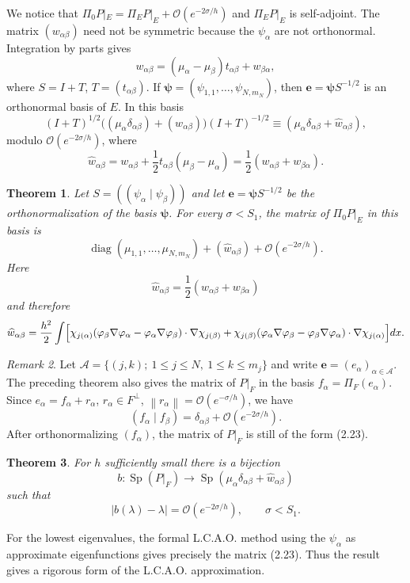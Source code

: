 \documentclass[11pt,a4paper]{article}
\newcommand{\Sp}{\operatorname{Sp}}
\newcommand{\cO}{\mathcal O}
\newcommand{\norm}[1]{\left\lVert #1\right\rVert}
\newcommand{\ip}[2]{\left(#1\mid #2\right)}
\numberwithin{equation}{section}
\newtheorem{theorem}{Theorem}[section]
\theoremstyle{remark}
\newtheorem{remark}[theorem]{Remark}
\begin{document}
We notice that $\Pi_0P|_E=\Pi_EP|_E+\cO(e^{-2\sigma/h})$ and $\Pi_EP|_E$ is self-adjoint. The matrix $(w_{\alpha\beta})$ need not be symmetric because the $\psi_\alpha$ are not orthonormal. Integration by parts gives
\begin{equation}
w_{\alpha\beta}=(\mu_\alpha-\mu_\beta)t_{\alpha\beta}+w_{\beta\alpha},
\tag{2.22}
\end{equation}
where $S=I+T$, $T=(t_{\alpha\beta})$. If $\boldsymbol\psi=(\psi_{1,1},\ldots,\psi_{N,m_N})$, then $\mathbf e=\boldsymbol\psi S^{-1/2}$ is an orthonormal basis of $E$. In this basis
\[
(I+T)^{1/2}\bigl((\mu_\alpha\delta_{\alpha\beta})+(w_{\alpha\beta})\bigr)(I+T)^{-1/2}
\equiv(\mu_\alpha\delta_{\alpha\beta}+\widehat w_{\alpha\beta}),
\]
modulo $\cO(e^{-2\sigma/h})$, where
\[
\widehat w_{\alpha\beta}=w_{\alpha\beta}+\frac12t_{\alpha\beta}(\mu_\beta-\mu_\alpha)
=\frac12(w_{\alpha\beta}+w_{\beta\alpha}).
\]

\begin{theorem}
Let $S=(\ip{\psi_\alpha}{\psi_\beta})$ and let $\mathbf e=\boldsymbol\psi S^{-1/2}$ be the orthonormalization of the basis $\boldsymbol\psi$. For every $\sigma<S_1$, the matrix of $\Pi_0P|_E$ in this basis is
\begin{equation}
\operatorname{diag}(\mu_{1,1},\ldots,\mu_{N,m_N})+(\widehat w_{\alpha\beta})+
\cO(e^{-2\sigma/h}).
\end{equation}
Here
\[
\widehat w_{\alpha\beta}=\frac12(w_{\alpha\beta}+w_{\beta\alpha})
\]
and therefore
\[
\widehat w_{\alpha\beta}=\frac{h^2}{2}\int\Bigl[
\chi_{j(\alpha)}(\varphi_\beta\nabla\varphi_\alpha-
\varphi_\alpha\nabla\varphi_\beta)\cdot\nabla\chi_{j(\beta)}
+\chi_{j(\beta)}(\varphi_\alpha\nabla\varphi_\beta-
\varphi_\beta\nabla\varphi_\alpha)\cdot\nabla\chi_{j(\alpha)}\Bigr]dx.
\]
\end{theorem}

\begin{remark}
Let $\mathcal A=\{(j,k);\ 1\le j\le N,\ 1\le k\le m_j\}$ and write $\mathbf e=(e_\alpha)_{\alpha\in\mathcal A}$. The preceding theorem also gives the matrix of $P|_F$ in the basis $f_\alpha=\Pi_F(e_\alpha)$. Since $e_\alpha=f_\alpha+r_\alpha$, $r_\alpha\in F^\perp$, $\norm{r_\alpha}=\cO(e^{-\sigma/h})$, we have
\[
\ip{f_\alpha}{f_\beta}=\delta_{\alpha\beta}+\cO(e^{-2\sigma/h}).
\]
After orthonormalizing $(f_\alpha)$, the matrix of $P|_F$ is still of the form (2.23).
\end{remark}

\begin{theorem}
For $h$ sufficiently small there is a bijection
\[
b:\Sp(P|_F)\longrightarrow\Sp(\mu_\alpha\delta_{\alpha\beta}+\widehat w_{\alpha\beta})
\]
such that
\[
|b(\lambda)-\lambda|=\cO(e^{-2\sigma/h}),\qquad\sigma<S_1.
\]
\end{theorem}
For the lowest eigenvalues, the formal L.C.A.O. method using the $\psi_\alpha$ as approximate eigenfunctions gives precisely the matrix (2.23). Thus the result gives a rigorous form of the L.C.A.O. approximation.
\end{document}
